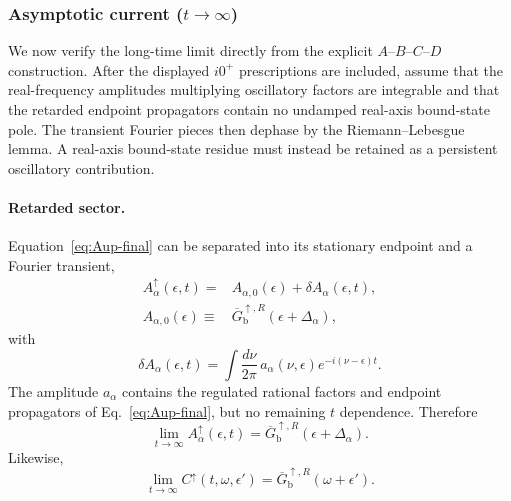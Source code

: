 \documentclass[
 reprint,
 superscriptaddress,
 amsmath,amssymb,
 aps,prb,
 longbibliography,
 floatfix
]{revtex4-2}
\begin{document}
\subsubsection{Asymptotic current ($t\rightarrow\infty$)}

We now verify the long-time limit directly from the explicit $A$--$B$--$C$--$D$ construction. After the displayed $i0^+$ prescriptions are included, assume that the real-frequency amplitudes multiplying oscillatory factors are integrable and that the retarded endpoint propagators contain no undamped real-axis bound-state pole. The transient Fourier pieces then dephase by the Riemann--Lebesgue lemma. A real-axis bound-state residue must instead be retained as a persistent oscillatory contribution.

\paragraph{Retarded sector.}
Equation~\eqref{eq:Aup-final} can be separated into its stationary endpoint and a Fourier transient,
\begin{equation}
\begin{aligned}
A_\alpha^\uparrow(\epsilon,t)
={}&
A_{\alpha,0}(\epsilon)
+
\delta A_\alpha(\epsilon,t),
\\
A_{\alpha,0}(\epsilon)
\equiv{}&
\overline G_{\mathrm b}^{\uparrow,R}
(\epsilon+\Delta_\alpha),
\end{aligned}
\label{eq:up-asymp-A-decomp}
\end{equation}
with
\begin{equation*}
\delta A_\alpha(\epsilon,t)
=
\int\frac{d\nu}{2\pi}\,
 a_\alpha(\nu,\epsilon)
 e^{-i(\nu-\epsilon)t}.
\end{equation*}
The amplitude $a_\alpha$ contains the regulated rational factors and endpoint propagators of Eq.~\eqref{eq:Aup-final}, but no remaining $t$ dependence. Therefore
\begin{equation}
\lim_{t\to\infty}
A_\alpha^\uparrow(\epsilon,t)
=
\overline G_{\mathrm b}^{\uparrow,R}
(\epsilon+\Delta_\alpha).
\label{eq:up-asymp-A}
\end{equation}
Likewise,
\begin{equation}
\lim_{t\to\infty}
C^\uparrow(t,\omega,\epsilon')
=
\overline G_{\mathrm b}^{\uparrow,R}
(\omega+\epsilon').
\label{eq:up-asymp-C}
\end{equation}
\end{document}
